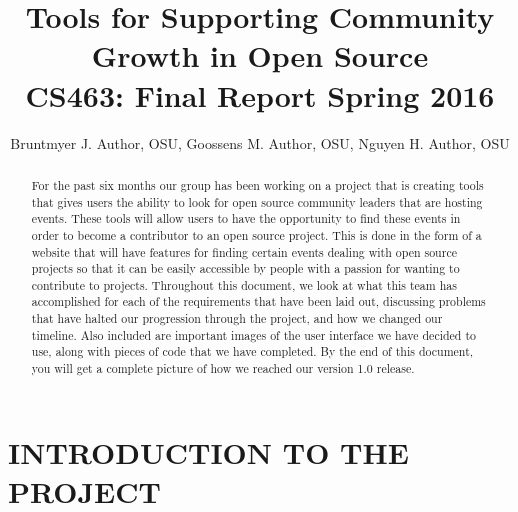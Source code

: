 \documentclass[draftclsnofoot,10pt,onecolumn]{IEEEtran} %
\begin{document}

\title{Tools for Supporting Community Growth in Open Source \\ {\large CS463: Final Report Spring 2016}}

\author{Bruntmyer J. Author, OSU, Goossens M. Author, OSU, Nguyen H. Author, OSU}



\maketitle
\begin{abstract}
For the past six months our group has been working on a project that is creating tools that
gives users the ability to look for open source community leaders that are
hosting events. These tools will allow
users to have the opportunity to find these events in order to become a
contributor to an open source project. This is done in the form of a website that
will have features for finding certain events dealing with open source projects
so that it can be easily accessible by people with a passion for wanting to
contribute to projects. Throughout this document, we look at what this team has
accomplished for each of the requirements that have been laid out, discussing problems
that have halted our progression through the project, and how we changed our timeline.
Also included are important images of the user interface we have decided
to use, along with pieces of code that we have completed. By the end of this document, 
you will get a complete picture of how we
reached our version 1.0 release.
\end{abstract}

\newpage


\section{INTRODUCTION TO THE PROJECT}
\end{document}

